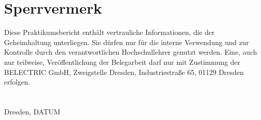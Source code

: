 \chapter*{Sperrvermerk}\thispagestyle{fancy}

Diese Praktikumsbericht enthält vertrauliche Informationen, die der Geheimhaltung unterliegen. Sie dürfen nur für die interne Verwendung und zur Kontrolle durch den verantwortlichen Hochschullehrer genutzt werden. Eine, auch nur teilweise, Veröffentlichung der Belegarbeit darf nur mit Zustimmung der BELECTRIC GmbH, Zweigstelle Dresden, Industriestraße 65, 01129 Dresden erfolgen.
\\ 
\\
\\
{\LARGE Dresden, DATUM}\\
